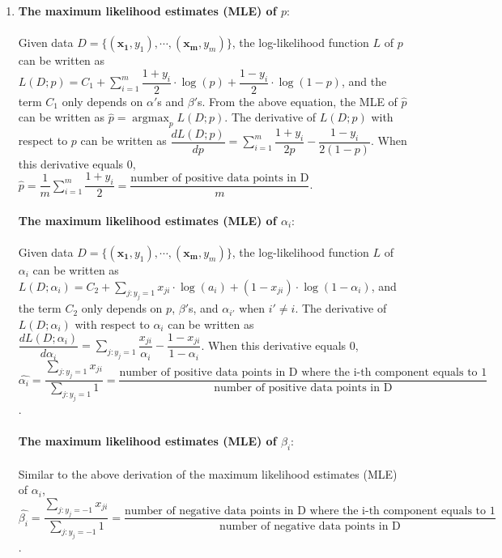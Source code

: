 \documentclass[english]{article}
\DeclareMathOperator*{\argmax}{argmax}
\begin{document}
\begin{enumerate}
  \item 
  \textbf{The maximum likelihood estimates (MLE) of $p$}:\\\\
  Given data $D=\{(\mathbf{x_1},y_1),\cdots,(\mathbf{x_m},y_m)\}$, the log-likelihood function $L$ of $p$ can be written as $L(D;p)=C_1 + \sum\limits_{i=1}^m\dfrac{1+y_i}{2}\cdot \log(p) + \dfrac{1-y_i}{2} \cdot \log(1-p)$, and the term $C_1$ only depends on $\alpha'$s and $\beta'$s. From the above equation, the MLE of $\hat{p}$ can be written as $\hat{p} = \argmax_p L(D;p)$. The derivative of $L(D;p)$ with respect to $p$ can be written as $\dfrac{dL(D;p)}{dp}=\sum\limits_{i=1}^m \dfrac{1+y_i}{2p}-\dfrac{1-y_i}{2(1-p)}$. When this derivative equals 0,\\ $\boxed{\hat{p}=\dfrac{1}{m}\sum\limits_{i=1}^m \dfrac{1+y_i}{2}=\dfrac{\text{number of positive data points in D}}{m}}$.\\\\
  \textbf{The maximum likelihood estimates (MLE) of $\alpha_i$}:\\\\
  Given data $D=\{(\mathbf{x_1},y_1),\cdots,(\mathbf{x_m},y_m)\}$, the log-likelihood function $L$ of $\alpha_i$ can be written as $L(D;\alpha_i)=C_2 + \sum\limits_{j:y_j=1} x_{ji} \cdot \log(a_i)+(1-x_{ji}) \cdot \log(1-\alpha_i)$, and the term $C_2$ only depends on $p$, $\beta'$s, and $\alpha_{i'}$ when $i' \neq i$. The derivative of $L(D;\alpha_i)$ with respect to $\alpha_i$ can be written as $\dfrac{dL(D;\alpha_i)}{d\alpha_i}=\sum\limits_{j:y_j=1} \dfrac{x_{ji}}{\alpha_i} - \dfrac{1-x_{ji}}{1-\alpha_i}$. When this derivative equals 0,\\ $\boxed{\hat{\alpha_i}=\dfrac{\sum\limits_{j:y_j=1} x_{ji}}{\sum\limits_{j:y_j=1} 1}=\dfrac{\text{number of positive data points in D where the i-th component equals to 1}}{\text{number of positive data points in D}}}$.\\\\
  \textbf{The maximum likelihood estimates (MLE) of $\beta_i$}:\\\\
  Similar to the above derivation of the maximum likelihood estimates (MLE) of $\alpha_i$,\\ $\boxed{\hat{\beta_i}=\dfrac{\sum\limits_{j:y_j=-1} x_{ji}}{\sum\limits_{j:y_j=-1} 1}=\dfrac{\text{number of negative data points in D where the i-th component equals to 1}}{\text{number of negative data points in D}}}$.\\\\


\end{enumerate}
\end{document}
